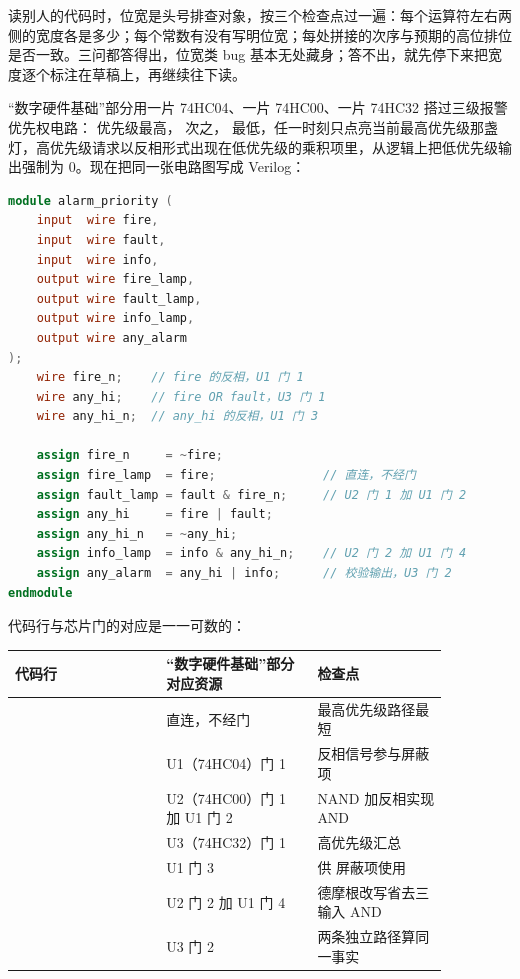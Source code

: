 读别人的代码时，位宽是头号排查对象，按三个检查点过一遍：每个运算符左右两侧的宽度各是多少；每个常数有没有写明位宽；每处拼接的次序与预期的高位排位是否一致。三问都答得出，位宽类 bug 基本无处藏身；答不出，就先停下来把宽度逐个标注在草稿上，再继续往下读。

“数字硬件基础”部分用一片 74HC04、一片 74HC00、一片 74HC32 搭过三级报警优先权电路： 优先级最高， 次之， 最低，任一时刻只点亮当前最高优先级那盏灯，高优先级请求以反相形式出现在低优先级的乘积项里，从逻辑上把低优先级输出强制为 0。现在把同一张电路图写成 Verilog：

\begin{lstlisting}[language=Verilog]
module alarm_priority (
    input  wire fire,
    input  wire fault,
    input  wire info,
    output wire fire_lamp,
    output wire fault_lamp,
    output wire info_lamp,
    output wire any_alarm
);
    wire fire_n;    // fire 的反相，U1 门 1
    wire any_hi;    // fire OR fault，U3 门 1
    wire any_hi_n;  // any_hi 的反相，U1 门 3

    assign fire_n     = ~fire;
    assign fire_lamp  = fire;               // 直连，不经门
    assign fault_lamp = fault & fire_n;     // U2 门 1 加 U1 门 2
    assign any_hi     = fire | fault;
    assign any_hi_n   = ~any_hi;
    assign info_lamp  = info & any_hi_n;    // U2 门 2 加 U1 门 4
    assign any_alarm  = any_hi | info;      // 校验输出，U3 门 2
endmodule
\end{lstlisting}

代码行与芯片门的对应是一一可数的：

\begin{longtable}{L{0.3\linewidth}L{0.3\linewidth}L{0.26\linewidth}}
\toprule
代码行 & “数字硬件基础”部分对应资源 & 检查点 \\
\midrule
{} & 直连，不经门 & 最高优先级路径最短 \\\tablerowrule
{} & U1（74HC04）门 1 & 反相信号参与屏蔽项 \\\tablerowrule
{} & U2（74HC00）门 1 加 U1 门 2 & NAND 加反相实现 AND \\\tablerowrule
{} & U3（74HC32）门 1 & 高优先级汇总 \\\tablerowrule
{} & U1 门 3 & 供  屏蔽项使用 \\\tablerowrule
{} & U2 门 2 加 U1 门 4 & 德摩根改写省去三输入 AND \\\tablerowrule
{} & U3 门 2 & 两条独立路径算同一事实 \\
\bottomrule
\end{longtable}

